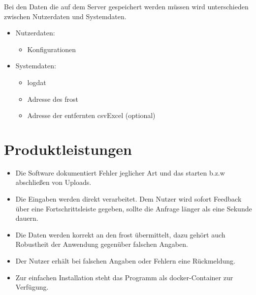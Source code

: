 \documentclass[a4paper, 12 pt]{article}
\begin{document}
	Bei den Daten die auf dem Server gespeichert werden müssen wird unterschieden zwischen Nutzerdaten und Systemdaten.
	
\begin{itemize}
	\item Nutzerdaten:
	\begin{itemize}
		\item Konfigurationen
	\end{itemize}
	\item Systemdaten:
	\begin{itemize}
		\item \gls{logdat}
		\item Adresse des \gls{frost}
		\item Adresse der entfernten \gls{csvExcel} (optional) 
	\end{itemize}
\end{itemize}
	
	\section{Produktleistungen}
	\begin{itemize}
		\item Die Software dokumentiert Fehler jeglicher Art und das starten b.z.w abschließen von Uploads.
		\item Die Eingaben werden direkt verarbeitet. Dem Nutzer wird sofort Feedback über eine Fortschrittsleiste gegeben, sollte die Anfrage länger als eine Sekunde dauern.
		\item Die Daten werden korrekt an den \gls{frost} übermittelt, dazu gehört auch Robustheit der Anwendung gegenüber falschen Angaben.
		\item Der Nutzer erhält bei falschen Angaben oder Fehlern eine Rückmeldung.
		\item Zur einfachen Installation steht das Programm als \gls{docker}-Container zur Verfügung.
	\end{itemize}
	
	
\end{document}
